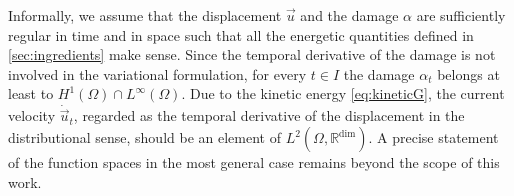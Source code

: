 \begin{remark}
Informally, we assume that the displacement $\vec{u}$ and the damage $\alpha$ are sufficiently regular in time and in space such that all the energetic quantities defined in \cref{sec:ingredients} make sense. Since the temporal derivative of the damage is not involved in the variational formulation, for every $t\in I$ the damage $\alpha_t$ belongs at least to $H^1(\Omega)\cap L^\infty(\Omega)$. Due to the kinetic energy \eqref{eq:kineticG}, the current velocity $\dot{\vec{u}}_t$, regarded as the temporal derivative of the displacement in the distributional sense, should be an element of $L^2(\Omega,\mathbb{R}^\mathrm{dim})$. A precise statement of the function spaces in the most general case remains beyond the scope of this work.
\end{remark}

